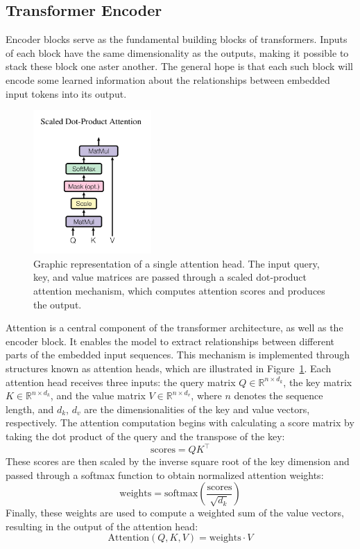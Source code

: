 \documentclass{pracalicmgr}
\begin{document}
\subsection{Transformer Encoder}

Encoder blocks serve as the fundamental building blocks of transformers. Inputs of each block have the same dimensionality as the outputs, making it possible to stack these block one aster another. The general hope is that each such block will encode some learned information about the relationships between embedded input tokens into its output.


\begin{figure}[h]
    \centering
    \includegraphics[width=0.4\textwidth]{src/scaledDotProd.png}
    \caption{Graphic representation of a single attention head. The input query, key, and value matrices are passed through a scaled dot-product attention mechanism, which computes attention scores and produces the output.\cite{Vaswani2017Attention}}
    \label{fig:singleAttentionHead}
\end{figure}

Attention is a central component of the transformer architecture, as well as the encoder block. It enables the model to extract relationships between different parts of the embedded input sequences. This mechanism is implemented through structures known as attention heads, which are illustrated in Figure~\ref{fig:singleAttentionHead}. Each attention head receives three inputs: the query matrix \( Q \in \mathbb{R}^{n \times d_k} \), the key matrix \( K \in \mathbb{R}^{n \times d_k} \), and the value matrix \( V \in \mathbb{R}^{n \times d_v} \), where \( n \) denotes the sequence length, and \( d_k \), \( d_v \) are the dimensionalities of the key and value vectors, respectively. The attention computation begins with calculating a score matrix by taking the dot product of the query and the transpose of the key: 
\[
\text{scores} = QK^\top
\]
These scores are then scaled by the inverse square root of the key dimension and passed through a softmax function to obtain normalized attention weights:
\[
\text{weights} = \text{softmax}\left(\frac{\text{scores}}{\sqrt{d_k}}\right)
\]
Finally, these weights are used to compute a weighted sum of the value vectors, resulting in the output of the attention head:
\[
\text{Attention}(Q, K, V) = \text{weights} \cdot V
\]
\end{document}
